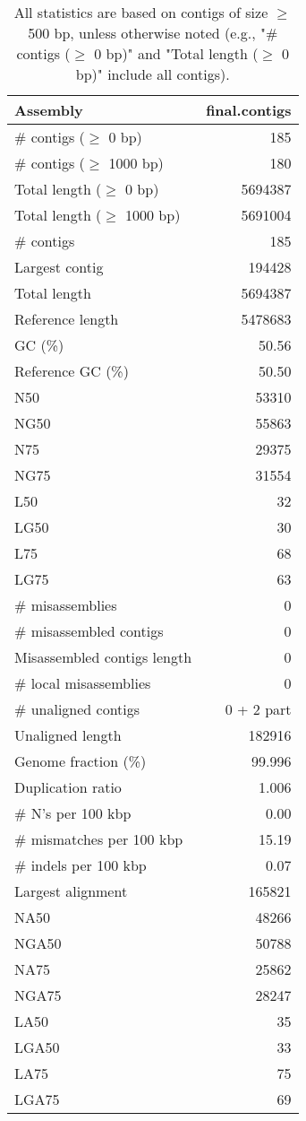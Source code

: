 \documentclass[12pt,a4paper]{article}
\begin{document}
\begin{table}[ht]
\begin{center}
\caption{All statistics are based on contigs of size $\geq$ 500 bp, unless otherwise noted (e.g., "\# contigs ($\geq$ 0 bp)" and "Total length ($\geq$ 0 bp)" include all contigs).}
\begin{tabular}{|l*{1}{|r}|}
\hline
Assembly & final.contigs \\ \hline
\# contigs ($\geq$ 0 bp) & 185 \\ \hline
\# contigs ($\geq$ 1000 bp) & 180 \\ \hline
Total length ($\geq$ 0 bp) & 5694387 \\ \hline
Total length ($\geq$ 1000 bp) & 5691004 \\ \hline
\# contigs & 185 \\ \hline
Largest contig & 194428 \\ \hline
Total length & 5694387 \\ \hline
Reference length & 5478683 \\ \hline
GC (\%) & 50.56 \\ \hline
Reference GC (\%) & 50.50 \\ \hline
N50 & 53310 \\ \hline
NG50 & 55863 \\ \hline
N75 & 29375 \\ \hline
NG75 & 31554 \\ \hline
L50 & 32 \\ \hline
LG50 & 30 \\ \hline
L75 & 68 \\ \hline
LG75 & 63 \\ \hline
\# misassemblies & 0 \\ \hline
\# misassembled contigs & 0 \\ \hline
Misassembled contigs length & 0 \\ \hline
\# local misassemblies & 0 \\ \hline
\# unaligned contigs & 0 + 2 part \\ \hline
Unaligned length & 182916 \\ \hline
Genome fraction (\%) & 99.996 \\ \hline
Duplication ratio & 1.006 \\ \hline
\# N's per 100 kbp & 0.00 \\ \hline
\# mismatches per 100 kbp & 15.19 \\ \hline
\# indels per 100 kbp & 0.07 \\ \hline
Largest alignment & 165821 \\ \hline
NA50 & 48266 \\ \hline
NGA50 & 50788 \\ \hline
NA75 & 25862 \\ \hline
NGA75 & 28247 \\ \hline
LA50 & 35 \\ \hline
LGA50 & 33 \\ \hline
LA75 & 75 \\ \hline
LGA75 & 69 \\ \hline
\end{tabular}
\end{center}
\end{table}
\end{document}
